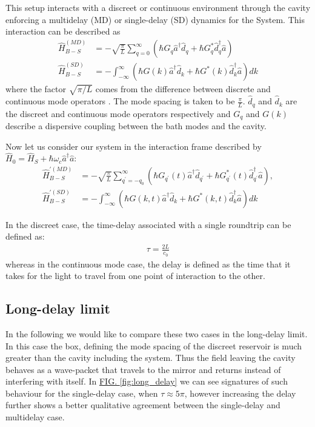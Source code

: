 \documentclass[%
 reprint,
 amsmath,amssymb,
pra,
]{revtex4-1}
\def\qp{{q^\prime}}
\def\aop{\hat{a}}
\def\adop{\hat{a}^\dagger}
\def\dop{\hat{d}}
\def\ddop{\hat{d}^\dagger}
\def\Hop{\hat{H}}
\def\qp{{q^\prime}}
\newcommand{\lk}{\left(}
\newcommand{\rk}{\right)}
\def\reffig#1{{\hyperref[#1]{FIG. \ref*{#1}}}}
\newcommand\note[1]{{\color{red}{#1}}}
\begin{document}
This setup interacts with a discreet or continuous environment through the cavity enforcing a multidelay (MD) or single-delay (SD) dynamics for the System. This interaction can be described as
\begin{align}
\Hop^{(MD)}_{B-S} &= -\sqrt{\frac{\pi}{L}}\sum_{q=0}^\infty\lk\hbar G_q\adop\dop_q + \hbar G^*_q\ddop_q\aop\rk\\
\Hop^{(SD)}_{B-S} &= -\int_{-\infty}^\infty\lk\hbar G(k)\adop\dop_k + \hbar G^*(k)\ddop_k\aop\rk dk
\end{align}
where the factor $\sqrt{\pi/L}$ comes from the difference between discrete and continuous mode operators \cite{Blow1990}. The mode spacing is taken to be $\frac{\pi}{L}$. $\dop_q$ and $\dop_k$ are the discreet and continuous mode operators respectively and $G_q$ and $G(k)$ describe a dispersive coupling between the bath modes and the cavity. \note{exact form of G?}

Now let us consider our system in the interaction frame described by $\Hop_0=\Hop_S+\hbar\omega_c\adop\aop$:%
\begin{align}
\Hop^{\prime(MD)}_{B-S} &= -\sqrt{\frac{\pi}{L}}\sum_{\qp=-q_0}^\infty\lk\hbar G_{\qp}(t)\adop\dop_{\qp} + \hbar G^*_{\qp}(t)\ddop_{\qp}\aop\rk,\\
\Hop^{\prime(SD)}_{B-S} &= -\int_{-\infty}^\infty\lk\hbar G(k,t)\adop\dop_k + \hbar G^*(k,t)\ddop_k\aop\rk dk
\end{align}

In the discreet case, the time-delay associated with a single roundtrip can be defined as:
\begin{align}
\label{eq:tau}
\tau = \frac{2L}{c_0}
\end{align}
whereas in the continuous mode case, the delay is defined as the time that it takes for the light to travel from one point of interaction to the other.

\subsection{Long-delay limit}
In the following we would like to compare these two cases in the long-delay limit. In this case the box, defining the mode spacing of the discreet reservoir is much greater than the cavity including the system. Thus the field leaving the cavity behaves as a wave-packet that travels to the mirror and returns instead of interfering with itself. In \reffig{fig:long_delay} we can see signatures of such behaviour for the single-delay case, when $\tau\approx 5\pi$, however increasing the delay further shows a better qualitative agreement between the single-delay and multidelay case.
\end{document}
